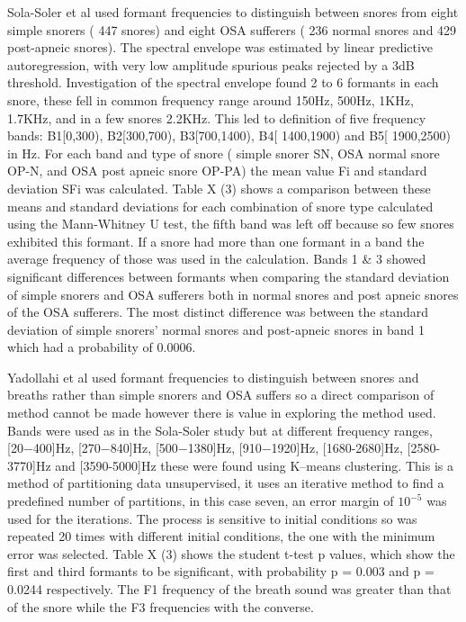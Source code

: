 Sola-Soler et al used formant frequencies to distinguish between snores from eight simple snorers ( 447 snores) and eight OSA sufferers ( 236 normal snores and 429 post-apneic snores). The spectral envelope was estimated by linear predictive autoregression, with very low amplitude spurious peaks rejected by a 3dB threshold. Investigation of the spectral envelope found 2 to 6 formants in each snore, these fell in common frequency range around 150Hz, 500Hz, 1KHz, 1.7KHz, and in a few snores 2.2KHz. This led to definition of five frequency bands: B1[0,300), B2[300,700), B3[700,1400), B4[ 1400,1900) and B5[ 1900,2500) in Hz. For each band and type of snore ( simple snorer SN, OSA normal snore OP-N, and OSA post apneic snore OP-PA) the mean value Fi and standard deviation SFi was calculated. Table X (3) shows a comparison between these means and standard deviations for each combination of snore type calculated using the Mann-Whitney U test, the fifth band was left off because so few snores exhibited this formant. If a snore had more than one formant in a band the average frequency of those was used in the calculation. Bands 1 \& 3 showed significant differences between formants when comparing the standard deviation of simple snorers and OSA sufferers both in normal snores and post apneic snores of the OSA sufferers. The most distinct difference was between the standard deviation of simple snorers’ normal snores and post-apneic snores in band 1 which had a probability of 0.0006. 

Yadollahi et al used formant frequencies to distinguish between snores and breaths rather than simple snorers and OSA suffers so a direct comparison of method cannot be made however there is value in exploring the method used. Bands were used as in the Sola-Soler study but at different frequency ranges, [20−400]Hz, [270−840]Hz, [500−1380]Hz, [910−1920]Hz, [1680-2680]Hz, [2580-3770]Hz and [3590-5000]Hz these were found using K–means clustering. This is a method of partitioning data unsupervised, it uses an iterative method to find a predefined number of partitions, in this case seven, an error margin of $10^{−5}$ was used for the iterations. The process is sensitive to initial conditions so was repeated 20 times with different initial conditions, the one with the minimum error was selected. Table X (3) shows the student t-test p values, which show the first and third formants to be significant, with probability p = 0.003 and p = 0.0244 respectively. The F1 frequency of the breath sound was greater than that of the snore while the F3 frequencies with the converse. 

